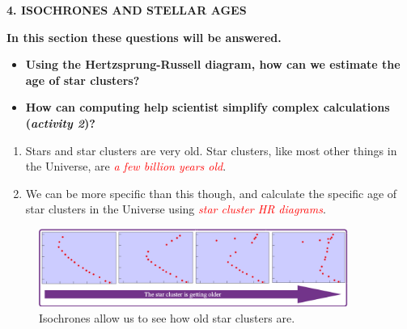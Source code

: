 \documentclass{article}
\begin{document}
    \begin{tcolorbox}[enhanced,colback=purple!80!black,colframe=purple!80!black,drop fuzzy shadow]
    \begin{center}  
    {\color{white}
        \Huge{\textbf{4. ISOCHRONES AND STELLAR AGES}}
    }
    \end{center}
    \end{tcolorbox}
    
    
    
    \begin{tcolorbox}[enhanced,colback=purple!80!white,colframe=purple!80!black]
    {\color{white}
        \textbf{In this section these questions will be answered.}
        \begin{itemize}
        \renewcommand\labelitemi{--}
            \item \textbf{Using the Hertzsprung-Russell diagram, how can we estimate the age of star clusters?} 
            \item \textbf{How can computing help scientist simplify complex calculations (\emph{activity 2})?}
        \end{itemize}
    }
    \end{tcolorbox}
    
    
    
    
    
    \begin{enumerate}[label=\color{purple}\theenumi]
        \item Stars and star clusters are very old. Star clusters, like most other things in the Universe, are \emph{\textcolor{red}{a few billion years old}}.
        
        \item We can be more specific than this though, and calculate the specific age of star clusters in the Universe using \emph{\textcolor{red}{star cluster HR diagrams}}.
    \end{enumerate}
    
    
    
    \begin{figure}[h!]
        \centering
        \includegraphics[width=0.9\textwidth]{Images/isochrone-age.png}
        \caption{Isochrones allow us to see how old star clusters are.}
        \label{iso-age}
    \end{figure}
    
\end{document}
